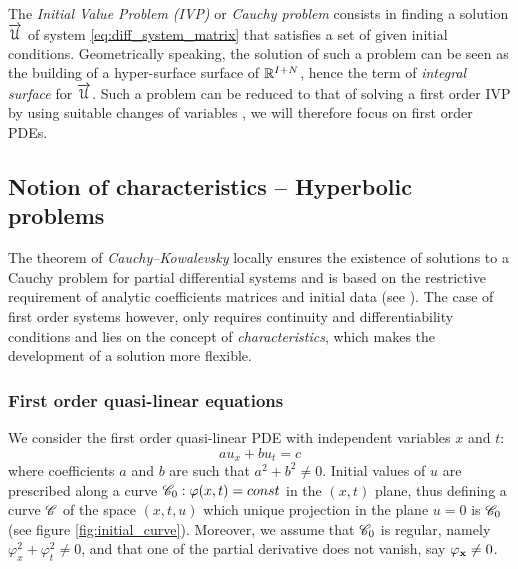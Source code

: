 The \textit{Initial Value Problem (IVP)} or \textit{Cauchy problem} consists in finding a solution ${\overrightarrow{\mathcal{U}}}$ of system \eqref{eq:diff_system_matrix} that satisfies a set of given initial conditions. Geometrically speaking, the solution of such a problem can be seen as the building of a hyper-surface surface of $\mathbb{R}^{I+N}$, hence the term of \textit{integral surface} for ${\overrightarrow{\mathcal{U}}}$. Such a problem can be reduced to that of solving a first order IVP by using suitable changes of variables \cite[p.54]{PDEs}, we will therefore focus on first order PDEs.

\subsection{Notion of characteristics -- Hyperbolic problems}
The theorem of \textit{Cauchy--Kowalevsky} locally ensures the existence of solutions to a Cauchy problem for partial differential systems and is based on the restrictive requirement of analytic coefficients matrices and initial data (see \cite[p.46]{PDEs}). The case of first order systems however, only requires continuity and differentiability conditions and lies on the concept of \textit{characteristics}, which makes the development of a solution more flexible.

\subsubsection*{First order quasi-linear equations}
We consider the first order quasi-linear PDE with independent variables $x$ and $t$:
\begin{equation}
  \label{eq:1st_order_pde}
   a u_x + b u_t  = c
\end{equation}
where coefficients $a$ and $b$ are such that $a^2 + b^2 \neq 0$. Initial values of $u$ are prescribed along a curve $\mathscr{C}_0:\varphi(x,t)=const$ in the $(x,t)$ plane, thus defining a curve $\mathscr{C}$ of the space $(x,t,u)$ which unique projection in the plane $u=0$ is $\mathscr{C}_0$ (see figure \ref{fig:initial_curve}).
Moreover, we assume that $\mathscr{C}_0$ is regular, namely $\varphi_x^2 + \varphi_t^2 \neq 0$, and that one of the partial derivative does not vanish, say $\varphi_{\mathbf{x}} \neq 0$.

